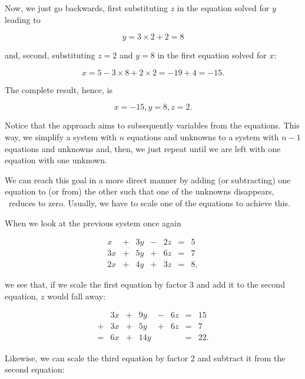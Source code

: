 \documentclass[tikz]{scrreprt}
\begin{document}
Now, we just go backwards, first 
substituting $z$ in the equation solved for $y$ leading to

\begin{equation}
y=3\times 2 + 2 = 8
\end{equation}

and, second, substituting $z=2$ and $y=8$ in the first equation
solved for $x$:

\begin{equation}
x = 5 - 3\times 8 + 2\times 2 = -19 + 4 = -15.
\end{equation}

The complete result, hence, is 

\[
x=-15, y=8, z=2.
\]

Notice that the approach aims to subsequently 
 variables from the equations.
This way, we simplify a system with $n$ equations 
and unknowns to a system with $n-1$ equations and unknowns
and, then, we just repeat until we are left with
one equation with one unknown.

We can reach this goal in a more direct manner
by adding (or subtracting) one equation to (or from)
the other such that one of the unknowns disappears,
\ie\ reduces to zero. Usually, we have to scale
one of the equations to achieve this.

When we look at the previous system once again

\begin{equation}
\begin{array}{rcrcrcr}
 x & + & 3y & - & 2z & = &  5\\
3x & + & 5y & + & 6z & = &  7\\
2x & + & 4y & + & 3z & = &  8,
\end{array}
\end{equation}

we see that, if we scale the first equation by factor 3
and add it to the second equation, $z$ would fall away:

\begin{equation}\label{eq:linPen1}
\begin{array}{crcrcrcr}
  & 3x & +  & 9y  & - & 6z & = & 15\\
+ & 3x & +  & 5y  & + & 6z & = &  7\\
= & 6x & + & 14y  &   &  & = & 22.
\end{array}
\end{equation}

Likewise, we can scale the third equation by factor 2
and subtract it from the second equation:
\end{document}
